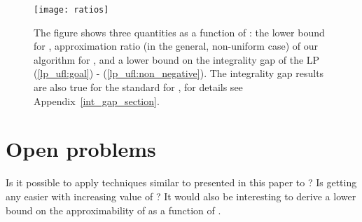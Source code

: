 \documentclass{llncs}
\begin{document}
\begin{figure}
  \centering
  \texttt{[image: ratios]}
 \caption{The figure shows three quantities as a function of : the lower bound for , approximation ratio (in the general, non-uniform case) of our algorithm for , and a lower bound on the integrality gap of the LP (\ref{lp_ufl:goal}) - (\ref{lp_ufl:non_negative}). The integrality gap results are also true for the  standard  for , for details see Appendix~\ref{int_gap_section}.}
  \label{fig:apx_plot}
\end{figure}

\section{Open problems}
Is it possible to apply techniques similar to presented in this paper to ? Is  getting any easier with increasing value of ? It would also be interesting to derive a lower bound on the approximability of  as a function of .
\end{document}
